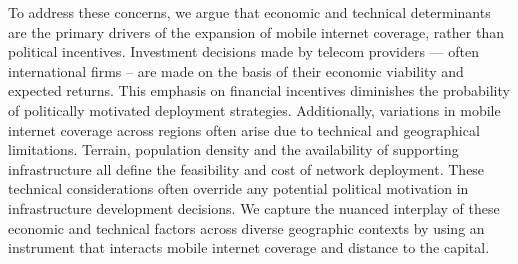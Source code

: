 \documentclass[11pt]{article}
\theoremstyle{plain}
\theoremstyle{plain}
\begin{document}
To address these concerns, we argue that economic and technical determinants are the primary drivers of the expansion of mobile internet coverage, rather than political incentives. Investment decisions made by telecom providers — often international firms – are made on the basis of their economic viability and expected returns. This emphasis on financial incentives diminishes the probability of politically motivated deployment strategies. Additionally, variations in mobile internet coverage across regions often arise due to technical and geographical limitations. Terrain, population density and the availability of supporting infrastructure all define the feasibility and cost of network deployment. These technical considerations often override any potential political motivation in infrastructure development decisions. We capture the nuanced interplay of these economic and technical factors across diverse geographic contexts by using an instrument that interacts mobile internet coverage and distance to the capital.\\
\end{document}
